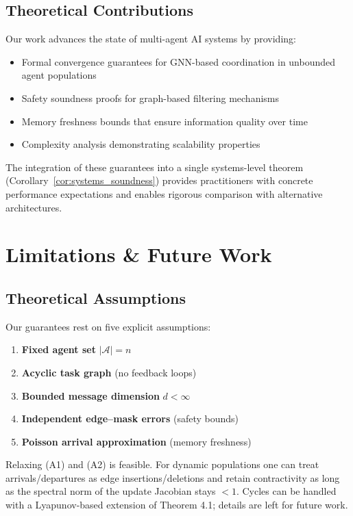 \documentclass{article}
\begin{document}
\subsection{Theoretical Contributions}
Our work advances the state of multi-agent AI systems by providing:
\begin{itemize}
\item Formal convergence guarantees for GNN-based coordination in unbounded agent populations
\item Safety soundness proofs for graph-based filtering mechanisms  
\item Memory freshness bounds that ensure information quality over time
\item Complexity analysis demonstrating scalability properties
\end{itemize}

The integration of these guarantees into a single systems-level theorem (Corollary~\ref{cor:systems_soundness}) provides practitioners with concrete performance expectations and enables rigorous comparison with alternative architectures.


\section{Limitations \& Future Work}
\label{sec:limitations_future_work}

\subsection{Theoretical Assumptions}
Our guarantees rest on five explicit assumptions:
\begin{enumerate}[label=(A\arabic*)]
\item \textbf{Fixed agent set} $|\mathcal{A}| = n$  
\item \textbf{Acyclic task graph} (no feedback loops)  
\item \textbf{Bounded message dimension} $d < \infty$  
\item \textbf{Independent edge–mask errors} (safety bounds)  
\item \textbf{Poisson arrival approximation} (memory freshness)  
\end{enumerate}

Relaxing (A1) and (A2) is feasible. For dynamic populations one can treat arrivals/departures as edge insertions/deletions and retain contractivity as long as the spectral norm of the update Jacobian stays $<1$. Cycles can be handled with a Lyapunov-based extension of Theorem 4.1; details are left for future work.
\end{document}
